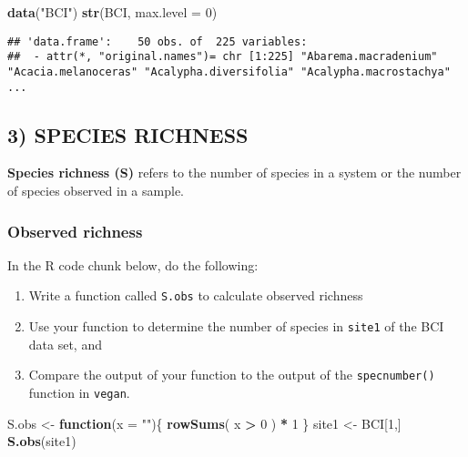 \documentclass[
]{article}
\newenvironment{Shaded}{\begin{snugshade}}{\end{snugshade}}
\newcommand{\AttributeTok}[1]{\textcolor[rgb]{0.13,0.29,0.53}{#1}}
\newcommand{\ControlFlowTok}[1]{\textcolor[rgb]{0.13,0.29,0.53}{\textbf{#1}}}
\newcommand{\DecValTok}[1]{\textcolor[rgb]{0.00,0.00,0.81}{#1}}
\newcommand{\FunctionTok}[1]{\textcolor[rgb]{0.13,0.29,0.53}{\textbf{#1}}}
\newcommand{\NormalTok}[1]{#1}
\newcommand{\OtherTok}[1]{\textcolor[rgb]{0.56,0.35,0.01}{#1}}
\newcommand{\SpecialCharTok}[1]{\textcolor[rgb]{0.81,0.36,0.00}{\textbf{#1}}}
\newcommand{\StringTok}[1]{\textcolor[rgb]{0.31,0.60,0.02}{#1}}
\begin{document}
\begin{Shaded}
\begin{Highlighting}[]
\FunctionTok{data}\NormalTok{(}\StringTok{"BCI"}\NormalTok{)}
\FunctionTok{str}\NormalTok{(BCI, }\AttributeTok{max.level =} \DecValTok{0}\NormalTok{)}
\end{Highlighting}
\end{Shaded}

\begin{verbatim}
## 'data.frame':    50 obs. of  225 variables:
##  - attr(*, "original.names")= chr [1:225] "Abarema.macradenium" "Acacia.melanoceras" "Acalypha.diversifolia" "Acalypha.macrostachya" ...
\end{verbatim}

\subsection{3) SPECIES RICHNESS}\label{species-richness}

\textbf{Species richness (S)} refers to the number of species in a
system or the number of species observed in a sample.

\subsubsection{Observed richness}\label{observed-richness}

In the R code chunk below, do the following:

\begin{enumerate}
\def\labelenumi{\arabic{enumi}.}
\item
  Write a function called \texttt{S.obs} to calculate observed richness
\item
  Use your function to determine the number of species in \texttt{site1}
  of the BCI data set, and
\item
  Compare the output of your function to the output of the
  \texttt{specnumber()} function in \texttt{vegan}.
\end{enumerate}

\begin{Shaded}
\begin{Highlighting}[]
\NormalTok{S.obs }\OtherTok{\textless{}{-}} \ControlFlowTok{function}\NormalTok{(}\AttributeTok{x =} \StringTok{""}\NormalTok{)\{}
  \FunctionTok{rowSums}\NormalTok{( x }\SpecialCharTok{\textgreater{}} \DecValTok{0}\NormalTok{  ) }\SpecialCharTok{*} \DecValTok{1}  
\NormalTok{  \}}
\NormalTok{site1 }\OtherTok{\textless{}{-}}\NormalTok{ BCI[}\DecValTok{1}\NormalTok{,]}
\FunctionTok{S.obs}\NormalTok{(site1)}
\end{Highlighting}
\end{Shaded}
\end{document}

